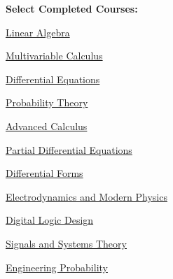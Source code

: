 \documentclass[10pt,a4paper,ragged2e,withhyper]{altacv}
\begin{document}
\begin{paracol}{2}
\switchcolumn


\vspace{-0.5cm}

\setlength\columnsep{7pt}
\begin{multicols}{2}

    
    \textbf{Select Completed Courses:}
    \vspace{0.375cm}
    \begin{tightemize}
        \item \href{https://www-math.umd.edu/undergraduate/departmental-course-pages/offered-courses/372-math-240-introduction-to-linear-algebra.html}{Linear Algebra}
        \item \href{https://www-math.umd.edu/undergraduate/departmental-course-pages/offered-courses/373-math-241-calculus-iii.html}{Multivariable Calculus}
        \item \href{https://www-math.umd.edu/undergraduate/departmental-course-pages/offered-courses/376-math-246-differential-equations-for-engineers.html}{Differential Equations}
        \item \href{https://www-math.umd.edu/undergraduate/departmental-course-pages/offered-courses/414-stat-410-introduction-to-probability-theory.html}{Probability Theory}
        \item \href{https://www-math.umd.edu/undergraduate/departmental-course-pages/offered-courses/387-math-410-advanced-calculus-i.html}{Advanced Calculus}
        \item \href{https://www-math.umd.edu/undergraduate/departmental-course-pages/offered-courses/404-math-462-partial-differential-equations-for-scientists-and-engineers.html}{Partial Differential Equations}
        \item \href{https://www-math.umd.edu/undergraduate/departmental-course-pages/offered-courses/398-math-437-differential-forms-and-their-applications.html}{Differential Forms}
        \item \href{https://umdphysics.umd.edu/academics/courses/966-physics-270-electrodynamics-light-relativity-modern-physics.html}{Electrodynamics and Modern Physics}
        \item \href{https://ece.umd.edu/course-schedule/course/ENEE244}{Digital Logic Design}
        \item \href{https://ece.umd.edu/course-schedule/course/ENEE322}{Signals and Systems Theory}
        \item \href{https://ece.umd.edu/course-schedule/course/ENEE324}{Engineering Probability}
    \end{tightemize}
    

\end{multicols}
\end{paracol}
\end{document}
